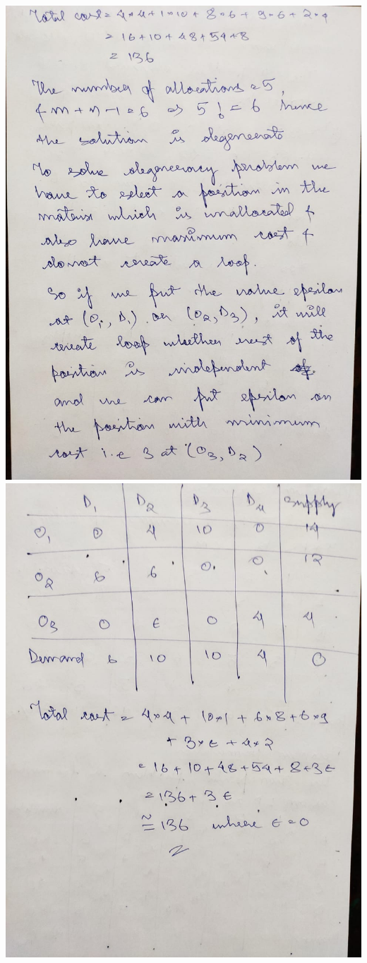\documentclass[12pt, letterpaper, twoside]{book}
\begin{document}
\includegraphics[width=\paperwidth, height=\paperheight]{Page6}
\includegraphics[width=\paperwidth, height=\paperheight]{Page7}
\end{document}
